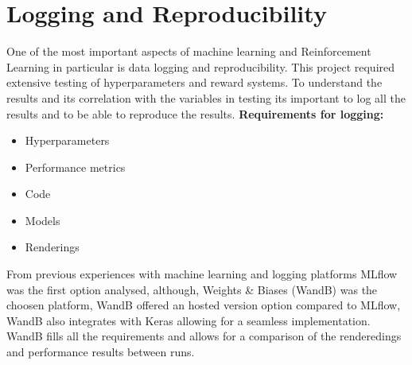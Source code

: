 \section{Logging and Reproducibility}
One of the most important aspects of machine learning and Reinforcement Learning in particular is data logging and reproducibility. 
This project required extensive testing of hyperparameters and reward systems. 
To understand the results and its correlation with the variables in testing its important to log all the results and to be able to reproduce the results.\linebreak
\textbf{Requirements for logging:}
\begin{itemize}[leftmargin=+0.5in]
       \item Hyperparameters
       \item Performance metrics
       \item Code
       \item Models
       \item Renderings
\end{itemize}
From previous experiences with machine learning and logging platforms MLflow was the first option analysed, although, Weights \& Biases (WandB) was the choosen platform, WandB offered an hosted version option compared to MLflow, WandB also integrates with Keras allowing for a seamless implementation. WandB fills all the requirements and allows for a comparison of the renderedings and performance results between runs.